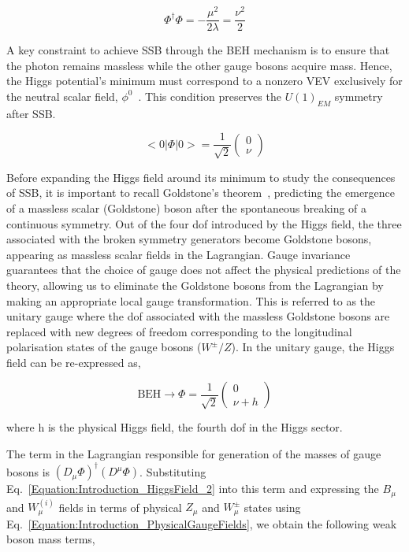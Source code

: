 \begin{equation}
    \Phi^{\dagger}\Phi = -\frac{\mu^{2}}{2\lambda} = \frac{\nu^2}{2}
\end{equation}

A key constraint to achieve SSB through the BEH mechanism is to ensure that the photon remains massless while the other gauge bosons acquire mass. Hence, the Higgs potential's minimum must correspond to a nonzero VEV exclusively for the neutral scalar field, $\phi^{0}$~\cite{Higgs_VacuumState_Choice}. This condition preserves the $U(1)_{EM}$ symmetry after SSB.

\begin{equation}
    <0|\Phi|0> = \frac{1}{\sqrt{2}} \begin{pmatrix}
        0 \\
        \nu
    \end{pmatrix}
\end{equation}
 
Before expanding the Higgs field around its minimum to study the consequences of SSB, it is important to recall Goldstone's theorem~\cite{Goldstone}, predicting the emergence of a massless scalar (Goldstone) boson after the spontaneous breaking of a continuous symmetry. Out of the four dof introduced by the Higgs field, the three associated with the broken symmetry generators become Goldstone bosons, appearing as massless scalar fields in the Lagrangian. Gauge invariance guarantees that the choice of gauge does not affect the physical predictions of the theory, allowing us to eliminate the Goldstone bosons from the Lagrangian by making an appropriate local gauge transformation. This is referred to as the unitary gauge where the dof associated with the massless Goldstone bosons are replaced with new degrees of freedom corresponding to the longitudinal polarisation states of the gauge bosons ($W^{\pm}/Z$). In the unitary gauge, the Higgs field can be re-expressed as,

\begin{equation}
    \text{BEH} \rightarrow \Phi = \frac{1}{\sqrt{2}}\begin{pmatrix}
        0 \\
        \nu + h
    \end{pmatrix} 
    \label{Equation:Introduction_HiggsField_2}
\end{equation}

where h is the physical Higgs field, the fourth dof in the Higgs sector.

The term in the Lagrangian responsible for generation of the masses of gauge bosons is $(D_\mu\Phi)^\dagger(D^\mu\Phi)$. Substituting Eq.~\ref{Equation:Introduction_HiggsField_2} into this term and expressing the $B_\mu$ and $W_{\mu}^{(i)}$ fields in terms of physical $Z_\mu$ and $W_{\mu}^{\pm}$ states using Eq.~\ref{Equation:Introduction_PhysicalGaugeFields}, we obtain the following weak boson mass terms,

